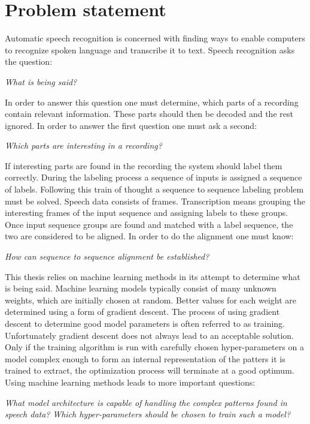 \chapter{Problem statement}
\label{cha:problemStatement}
Automatic speech recognition is concerned with finding ways to enable computers to recognize spoken language and transcribe it to text. Speech recognition asks the question: 

\noindent \textit{What is being said?}

In order to answer this question one must determine, which parts of a recording contain relevant information. These parts should then be decoded and the rest ignored. In order to answer the first question one must ask a second: 

\noindent \textit{Which parts are interesting in a recording?}

If interesting parts are found in the recording the system should label them correctly. During the labeling process a sequence of inputs is assigned a sequence of labels. Following this train of thought a sequence to sequence labeling problem must be solved. Speech data consists of frames. Transcription means grouping the interesting frames of the input sequence and assigning labels to these groups. Once input sequence groups are found and matched with a label sequence, the two are considered to be aligned. In order to do the alignment one must know: 

\noindent \textit{How can sequence to sequence alignment be established?} 

This thesis relies on machine learning methods in its attempt to determine what is being said. Machine learning models typically consist of many unknown weights, which are initially chosen at random. Better values for each weight are determined using a form of gradient descent. The process of using gradient descent to determine good model parameters is often referred to as training. Unfortunately gradient descent does not always lead to an acceptable solution. Only if the training algorithm is run with carefully chosen hyper-parameters on a model complex enough to form an internal representation of the patters it is trained to extract, the optimization process will terminate at a good optimum. Using machine learning methods leads to more important questions: 

\noindent \textit{What model architecture is capable of handling the complex patterns found in speech data?}
\textit{Which hyper-parameters should be chosen to train such a model?}

